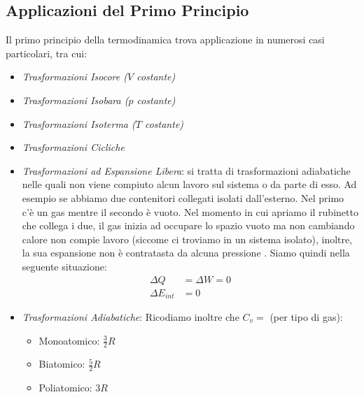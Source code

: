         \subsection{Applicazioni del Primo Principio} Il primo principio della 
        termodinamica trova applicazione in numerosi casi particolari, tra cui:
            \begin{itemize}
                \item \textit{Trasformazioni Isocore ($V$ costante)}
                \item \textit{Trasformazioni Isobara ($p$ costante)}

                \item \textit{Trasformazioni Isoterma ($T$ costante)}
                \item \textit{Trasformazioni Cicliche}
                \item \textit{Trasformazioni ad Espansione Libera}: si tratta 
                        di trasformazioni adiabatiche nelle quali non viene 
                        compiuto alcun lavoro sul sistema o da parte di esso.
                        Ad esempio se abbiamo due contenitori collegati isolati 
                        dall'esterno. Nel primo c'è un gas mentre il secondo è
                        vuoto. Nel momento in cui apriamo il rubinetto che 
                        collega i due, il gas inizia ad occupare lo spazio 
                        vuoto ma non cambiando calore non compie lavoro 
                        (siccome ci troviamo in un sistema isolato), inoltre,
                        la sua espansione non è contratasta da alcuna pressione
                        . Siamo quindi nella seguente situazione:
                        \begin{align*}
                            \Delta Q &= \Delta W = 0 \\
                            \Delta E_{int} &= 0
                        \end{align*}
                        
                \item \textit{Trasformazioni Adiabatiche}:
                        Ricodiamo inoltre che $C_v = $ (per tipo di gas):
                        \begin{itemize}
                            \item Monoatomico: $\frac{3}{2} R$
                            \item Biatomico: $\frac{5}{2} R$
                            \item Poliatomico: $3 R$
                        \end{itemize}
            \end{itemize}

